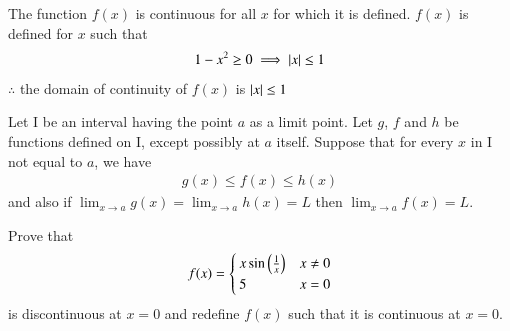 \documentclass[journal,12pt,twocolumn]{IEEEtran}
\begin{document}
The function $f(x)$ is continuous for all $x$ for which it is defined. $f(x)$ is defined for $x$ such that
\begin{align}
1-x^2 \ge 0 \implies \left\vert x\right\vert \le 1
\end{align}
$\therefore$ the domain of continuity of $f(x)$ is $\left\vert x\right\vert \le 1$ 
\begin{proposition}
\label{prop: Sandwich Principle}
Let I be an interval having the point $a$ as a limit point. Let $g$, $f$ and $h$ be functions defined on I, except possibly at $a$ itself. Suppose that for every $x$ in I not equal to $a$, we have
\begin{align}
g(x) \leq f(x) \leq h(x) 
\end{align} and also if $\lim_{x \to a} g(x) = \lim_{x \to a} h(x) = L$ then $\lim_{x \to a} f(x) = L$.
\end{proposition}
\begin{problem}
Prove that 
\begin{equation}
f(x)= \begin{cases} 
      x \sin\left(\frac{1}{x}\right) & x\neq 0 \\
      5 & x= 0  
   \end{cases}
\end{equation}
is discontinuous at $x=0$ and redefine $f(x)$ such that it is continuous at $x=0$.
\end{problem}
\end{document}
